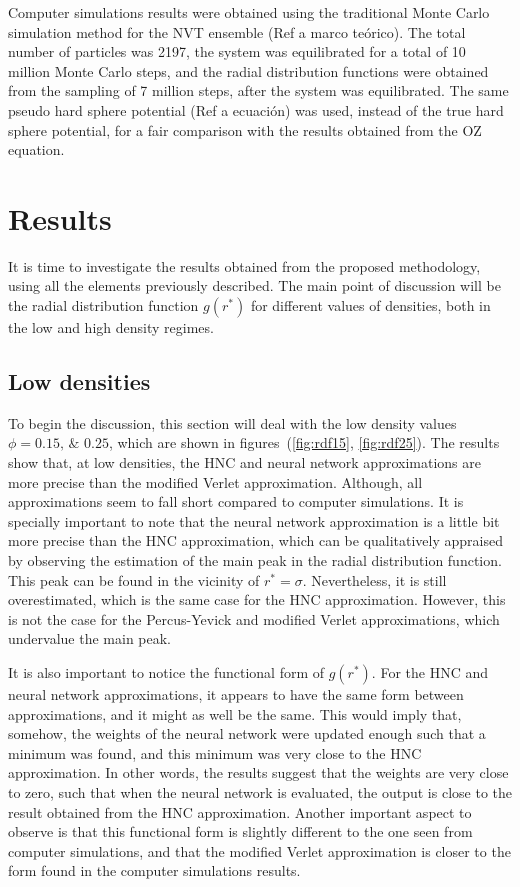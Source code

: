 Computer simulations results were obtained using the traditional Monte Carlo simulation
method for the NVT ensemble (Ref a marco teórico). The total number of particles was 2197,
the system was equilibrated for a total of 10 million Monte Carlo steps, and the radial
distribution functions were obtained from the sampling of 7 million steps, after
the system was equilibrated.
The same pseudo hard sphere potential (Ref a ecuación) was used, instead of the true hard 
sphere potential, for a fair comparison with the results obtained from the OZ equation.

\section{Results}
It is time to investigate the results obtained from the proposed methodology, using all the 
elements previously described. The main point of discussion will be the radial distribution
function \textemdash $g(r^*)$ \textemdash for different values of densities, both in the
low and high density regimes.

\subsection{Low densities}
To begin the discussion, this section will deal with the low 
density values $\phi=\numlist[list-pair-separator={\enspace\text{and}\enspace}]{0.15;0.25}$, which are shown in figures~(\ref{fig:rdf15}, \ref{fig:rdf25}).
The results show that, at low densities, the HNC and neural network approximations are
more precise than the modified Verlet approximation. Although, all
approximations seem to fall short compared to computer simulations. It is specially
important to note that the neural network approximation is a little bit more precise than
the HNC approximation, which can be qualitatively appraised by observing the estimation of 
the main peak in the radial distribution function. This peak can be found in the vicinity 
of $r^* = \sigma$. Nevertheless, it is still overestimated, which is the same case for the
HNC approximation. However, this is not the case for the Percus-Yevick and modified Verlet 
approximations, which undervalue the main peak.

It is also important to notice the functional form of $g(r^*)$. For the HNC and neural
network approximations, it appears to have the same form between approximations, and it 
might as well be the same. This would imply that, somehow, the weights of the neural network
were updated enough such that a minimum was found, and this minimum was very close to the
HNC approximation. In other words, the results suggest that the weights are very close to
zero, such that when the neural network is evaluated, the output is close to the
result obtained from the HNC approximation.
Another important aspect to observe is that this functional form is slightly different
to the one seen from computer simulations, and that the modified Verlet approximation is 
closer to the form found in the computer simulations results.

